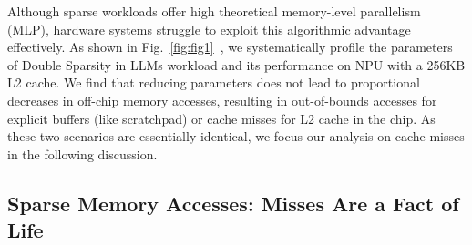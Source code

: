Although sparse workloads offer high theoretical memory-level parallelism (MLP), hardware systems struggle to exploit this algorithmic advantage effectively.
As shown in Fig.~\ref{fig:fig1}~, we systematically profile the parameters of Double  Sparsity\cite{21doublesparsity} in LLMs workload and its performance on NPU with a 256KB L2 cache. 
We find that reducing parameters does not lead to proportional decreases in off-chip memory accesses, resulting in out-of-bounds accesses for explicit buffers (like scratchpad) or cache misses for L2 cache in the chip. As these two scenarios are essentially identical, we focus our analysis on cache misses in the following discussion.





\vspace{-2pt}
\subsection{Sparse Memory Accesses: Misses Are a Fact of Life}
\label{sc:sc1}
\vspace{-2pt}


